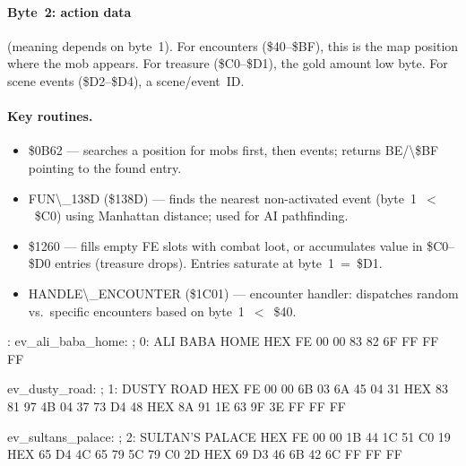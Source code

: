 \documentclass[10pt]{report}
\begin{document}
\paragraph{Byte~2: action data} (meaning depends on byte~1).
For encounters (\$40--\$BF), this is the map position where the mob
appears.  For treasure (\$C0--\$D1), the gold amount low byte.
For scene events (\$D2--\$D4), a scene/event~ID.

\paragraph{Key routines.}
\begin{itemize}
\item \$0B62 --- searches a position for mobs first, then events;
      returns {\Tt{}{\textbackslash}{\$}BE/{\textbackslash}{\$}BF\nwendquote} pointing to the found entry.
\item {\Tt{}FUN{\textbackslash}{\_}138D\nwendquote} (\$138D) --- finds the nearest non-activated event
      (byte~1~$<$~\$C0) using Manhattan distance; used for AI
      pathfinding.
\item \$1260 --- fills empty {\Tt{}{\textbackslash}{\$}FE\nwendquote} slots with combat loot, or
      accumulates value in \$C0--\$D0 entries (treasure drops).
      Entries saturate at byte~1~=~\$D1.
\item {\Tt{}HANDLE{\textbackslash}{\_}ENCOUNTER\nwendquote} (\$1C01) --- encounter handler: dispatches
      random vs.\ specific encounters based on byte~1~$<$~\$40.
\end{itemize}

\nwenddocs{}\endmoddef\nwstartdeflinemarkup\nwenddeflinemarkup
{}:
ev_ali_baba_home:                       ; 0: ALI BABA HOME
    HEX FE 00 00 83 82 6F FF FF FF

ev_dusty_road:                          ; 1: DUSTY ROAD
    HEX FE 00 00 6B 03 6A 45 04 31
    HEX 83 81 97 4B 04 37 73 D4 48
    HEX 8A 91 1E 63 9F 3E FF FF FF

ev_sultans_palace:                      ; 2: SULTAN'S PALACE
    HEX FE 00 00 1B 44 1C 51 C0 19
    HEX 65 D4 4C 65 79 5C 79 C0 2D
    HEX 69 D3 46 6B 42 6C FF FF FF
\end{document}
